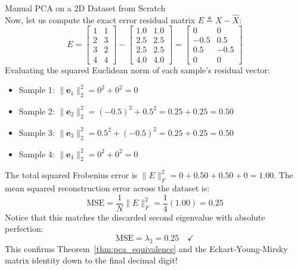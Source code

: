 \begin{examplebox}{Manual PCA on a 2D Dataset from Scratch}
\begin{equation}
\end{equation}
Now, let us compute the exact error residual matrix $E \triangleq X - \hat{X}$:
\begin{equation}
E = \begin{bmatrix} 1 & 1 \\ 2 & 3 \\ 3 & 2 \\ 4 & 4 \end{bmatrix} - \begin{bmatrix} 1.0 & 1.0 \\ 2.5 & 2.5 \\ 2.5 & 2.5 \\ 4.0 & 4.0 \end{bmatrix} = \begin{bmatrix} 0 & 0 \\ -0.5 & 0.5 \\ 0.5 & -0.5 \\ 0 & 0 \end{bmatrix}
\end{equation}
Evaluating the squared Euclidean norm of each sample's residual vector:
\begin{itemize}
    \item Sample 1: $\|\mathbf{e}_1\|_2^2 = 0^2 + 0^2 = 0$
    \item Sample 2: $\|\mathbf{e}_2\|_2^2 = (-0.5)^2 + 0.5^2 = 0.25 + 0.25 = 0.50$
    \item Sample 3: $\|\mathbf{e}_3\|_2^2 = 0.5^2 + (-0.5)^2 = 0.25 + 0.25 = 0.50$
    \item Sample 4: $\|\mathbf{e}_4\|_2^2 = 0^2 + 0^2 = 0$
\end{itemize}
The total squared Frobenius error is $\|E\|_F^2 = 0 + 0.50 + 0.50 + 0 = 1.00$.
The mean squared reconstruction error across the dataset is:
\begin{equation}
\text{MSE} = \frac{1}{N}\|E\|_F^2 = \frac{1}{4}(1.00) = \mathbf{0.25}
\end{equation}
Notice that this matches the discarded second eigenvalue with absolute perfection:
\begin{equation}
\text{MSE} = \lambda_2 = 0.25 \quad \checkmark
\end{equation}
This confirms Theorem~\ref{thm:pca_equivalence} and the Eckart-Young-Mirsky matrix identity down to the final decimal digit!
\end{examplebox}

